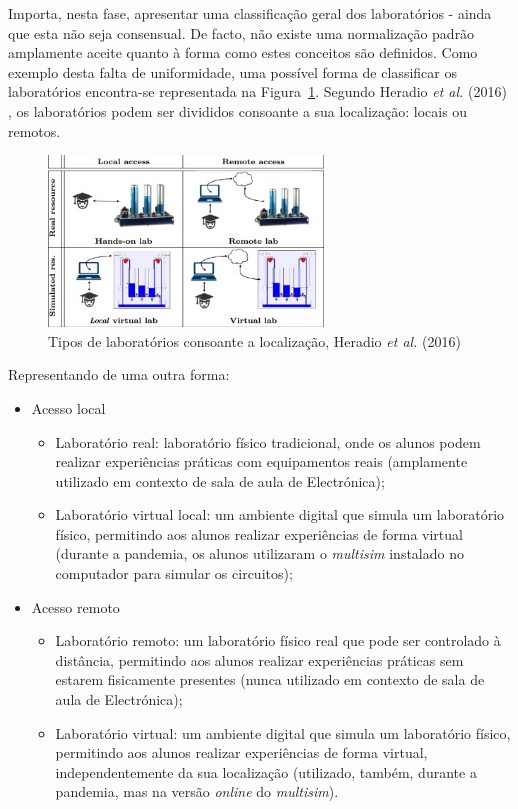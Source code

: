 Importa, nesta fase, apresentar uma classificação geral dos laboratórios - ainda que esta não seja consensual. De facto, não existe uma normalização padrão amplamente aceite quanto à forma como estes conceitos são definidos. Como exemplo desta falta de uniformidade, uma possível forma de classificar os laboratórios encontra-se representada na Figura~\ref{fig:classificaçãoHeratio}. Segundo Heradio \textit{et al.} (2016) \cite{HERADIO20161}, os laboratórios podem ser divididos consoante a sua localização: locais ou remotos.

\begin{figure}[hbtp]
    \centering
    \includegraphics[width=0.65\textwidth]{figures/caracteristica_laboratories.jpg}
    \caption{Tipos de laboratórios consoante a localização, Heradio \textit{et al.} (2016) \cite{HERADIO20161}}
    \label{fig:classificaçãoHeratio}
\end{figure}

Representando de uma outra forma:
\begin{itemize}
    \item Acesso local
          \begin{itemize}
              \item Laboratório real: laboratório físico tradicional, onde os alunos podem realizar experiências práticas com equipamentos reais (amplamente utilizado em contexto de sala de aula de Electrónica);
              \item Laboratório virtual local: um ambiente digital que simula um laboratório físico, permitindo aos alunos realizar experiências de forma virtual (durante a pandemia, os alunos utilizaram o \textit{multisim} instalado no computador para simular os circuitos);
          \end{itemize}
    \item Acesso remoto
          \begin{itemize}
              \item Laboratório remoto: um laboratório físico real que pode ser controlado à distância, permitindo aos alunos realizar experiências práticas sem estarem fisicamente presentes (nunca utilizado em contexto de sala de aula de Electrónica);
              \item Laboratório virtual: um ambiente digital que simula um laboratório físico, permitindo aos alunos realizar experiências de forma virtual, independentemente da sua localização (utilizado, também, durante a pandemia, mas na versão \textit{online} do \textit{multisim}).
          \end{itemize}
\end{itemize}

